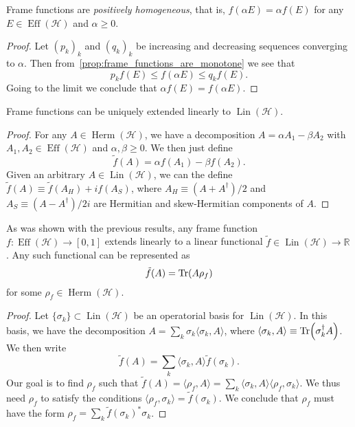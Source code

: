 \documentclass[12pt]{report}
\newcommand{\RR}{\mathbb{R}}
\newcommand{\on}[1]{\operatorname{#1}}
\newcommand{\calH}{{\mathcal{H}}}
\DeclareMathOperator{\Herm}{Herm}
\DeclareMathOperator{\Lin}{Lin}
\begin{document}
\begin{prop}
	Frame functions are \emph{positively homogeneous}, that is, $f(\alpha E)=\alpha f(E)$ for any $E\in\on{Eff}(\calH)$ and $\alpha\ge0$.
\end{prop}
\begin{proof}
	Let $(p_k)_k$ and $(q_k)_k$ be increasing and decreasing sequences converging to $\alpha$. Then from~\cref{prop:frame_functions_are_monotone} we see that
	\begin{equation}
		p_k f(E) \le f(\alpha E) \le q_k f(E).
	\end{equation}
	Going to the limit we conclude that $\alpha f(E)=f(\alpha E)$.
\end{proof}

\begin{prop}
	Frame functions can be uniquely extended linearly to $\Lin(\calH)$.
\end{prop}
\begin{proof}
	For any $A\in\Herm(\calH)$, we have a decomposition $A=\alpha A_1 - \beta A_2$ with $A_1,A_2\in\on{Eff}(\calH)$ and $\alpha,\beta\ge0$.
	We then just define
	\begin{equation}
		\tilde f(A) = \alpha f(A_1) - \beta f(A_2).
	\end{equation}
	Given an arbitrary $A\in\Lin(\calH)$, we can the define $\tilde f(A)\equiv \tilde f(A_H) + i f(A_S)$, where $A_H\equiv (A+A^\dagger)/2$ and $A_S\equiv (A-A^\dagger)/2i$ are Hermitian and skew-Hermitian components of $A$.
\end{proof}

\begin{prop}
	As was shown with the previous results, any frame function $f:\on{Eff}(\calH)\to[0,1]$ extends linearly to a linear functional $\tilde f\in\Lin(\calH)\to\RR$. Any such functional can be represented as
	\begin{equation}
		\tilde f(A) = \Tr(A \rho_f)
	\end{equation}
	for some $\rho_f\in\Herm(\calH)$.
\end{prop}
\begin{proof}
	Let $\{\sigma_k\}\subset\Lin(\calH)$ be an operatorial basis for $\Lin(\calH)$.
	In this basis, we have the decomposition $A=\sum_k \sigma_k \langle \sigma_k, A\rangle$, where $\langle \sigma_k,A\rangle\equiv\Tr(\sigma_k^\dagger A)$.
	We then write
	\begin{equation}
		\tilde f(A) = \sum_k \langle \sigma_k,A\rangle \tilde f(\sigma_k).
	\end{equation}
	Our goal is to find $\rho_f$ such that $\tilde f(A)=\langle \rho_f,A\rangle = \sum_k \langle\sigma_k,A\rangle \langle\rho_f,\sigma_k\rangle$.
	We thus need $\rho_f$ to satisfy the conditions
	$\langle\rho_f,\sigma_k\rangle = \tilde f(\sigma_k)$.
	We conclude that $\rho_f$ must have the form $\rho_f=\sum_k \tilde f(\sigma_k)^* \sigma_k$.
\end{proof}
\end{document}
